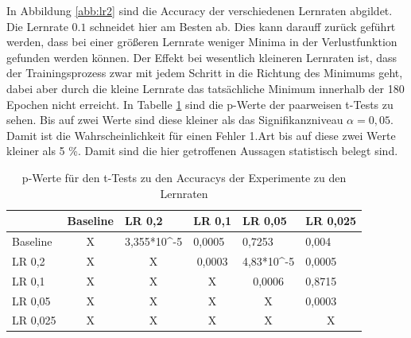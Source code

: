  In Abbildung \ref{abb:lr2} sind die Accuracy der verschiedenen Lernraten abgildet. Die Lernrate $0.1$ schneidet hier am Besten ab. Dies kann darauff zurück geführt werden, dass bei einer größeren Lernrate weniger Minima in der Verlustfunktion gefunden werden können. Der Effekt bei wesentlich kleineren Lernraten ist, dass der Trainingsprozess zwar mit jedem Schritt in die Richtung des Minimums geht, dabei aber durch die kleine Lernrate das tatsächliche Minimum innerhalb der 180 Epochen nicht erreicht. In Tabelle \ref{tab:lr2} sind die p-Werte der paarweisen t-Tests zu sehen. Bis auf zwei Werte sind diese kleiner als das Signifikanzniveau $\alpha=0,05$. Damit ist die Wahrscheinlichkeit für einen Fehler 1.Art bis auf diese zwei Werte kleiner als 5 \%. Damit sind die hier getroffenen Aussagen statistisch belegt sind.
 
\begin{table}[]
\caption{p-Werte für den t-Tests zu den Accuracys der Experimente zu den Lernraten}
\begin{tabular}{l|c|c|c|c|l|}
\cline{2-6}
                               & \multicolumn{1}{l|}{Baseline} & \multicolumn{1}{l|}{LR 0,2}  & \multicolumn{1}{l|}{LR 0,1} & \multicolumn{1}{l|}{LR 0,05}                        & LR 0,025                       \\ \hline
\multicolumn{1}{|l|}{Baseline} & X                             & 3,355*10\textasciicircum{}-5 & \multicolumn{1}{l|}{0,0005} & \multicolumn{1}{l|}{\cellcolor[HTML]{FE0000}0,7253} & 0,004                          \\ \hline
\multicolumn{1}{|l|}{LR 0,2}   & X                             & X                            & 0,0003                      & 4,83*10\textasciicircum{}-5                         & 0,0005                         \\ \hline
\multicolumn{1}{|l|}{LR 0,1}   & X                             & X                            & X                           & 0,0006                                              & \cellcolor[HTML]{FE0000}0,8715 \\ \hline
\multicolumn{1}{|l|}{LR 0,05}  & X                             & X                            & X                           & X                                                   & 0,0003                         \\ \hline
\multicolumn{1}{|l|}{LR 0,025} & X                             & X                            & X                           & X                                                   & \multicolumn{1}{c|}{X}         \\ \hline
\end{tabular}
\label{tab:lr2}
\end{table}
 
